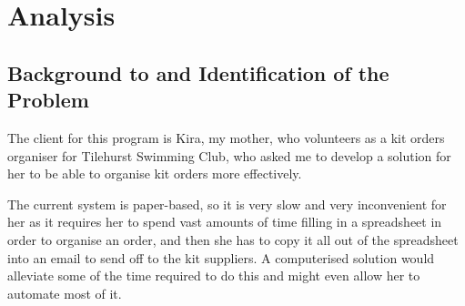 \documentclass[
11pt, %
a4paper, %
oneside, %
headinclude,footinclude, %
BCOR5mm, %
]{scrartcl}
\begin{document}


\section{Analysis}
\subsection{Background to and Identification of the Problem}
The client for this program is Kira, my mother, who volunteers as a kit orders organiser for Tilehurst Swimming Club, who asked me to develop a solution for her to be able to organise kit orders more effectively. \par The current system is paper-based, so it is very slow and very inconvenient for her as it requires her to spend vast amounts of time filling in a spreadsheet in order to organise an order, and then she has to copy it all out of the spreadsheet into an email to send off to the kit suppliers. A computerised solution would alleviate some of the time required to do this and might even allow her to automate most of it.
\end{document}
